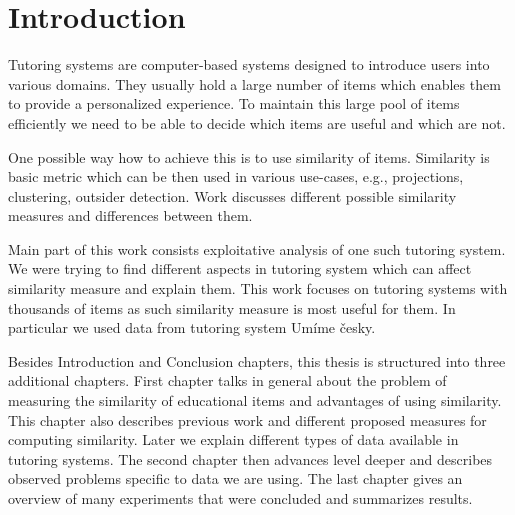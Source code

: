 \documentclass[
  digital, %
  table,   %
  nolof,     %
  nolot,     %
  nocover,
  color
]{fithesis3}
\begin{document}
\newcommand{\ppl}[1]{\textcolor[rgb]{0.6,0.2,1.0}{#1}}
\newcommand{\umimeCesky}{\ppl{Umíme česky}}



\chapter*{Introduction}



Tutoring systems are computer-based systems designed to introduce users into various domains. They usually hold a large number of items which enables them to provide a personalized experience. To maintain this large pool of items efficiently we need to be able to decide which items are useful and which are not.


One possible way how to achieve this is to use similarity of items. Similarity is basic metric which can be then used in various use-cases, e.g., projections, clustering, outsider detection. Work discusses different possible similarity measures and differences between them.



Main part of this work consists exploitative analysis of one such tutoring system. We were trying to find different aspects in tutoring system which can affect similarity measure and explain them. This work focuses on tutoring systems with thousands of items as such similarity measure is most useful for them. In particular we used data from tutoring system \umimeCesky{}.


Besides Introduction and Conclusion chapters, this thesis is structured into three additional chapters. First chapter talks in general about the problem of measuring the similarity of educational items and advantages of using similarity. This chapter also describes previous work and different proposed measures for computing similarity. Later we explain different types of data available in tutoring systems. The second chapter then advances level deeper and describes observed problems specific to data we are using.
The last chapter gives an overview of many experiments that were concluded and summarizes results.
\end{document}
